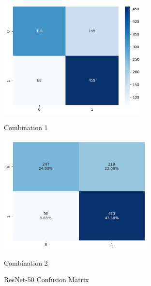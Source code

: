 \begin{figure}[H]
    \centering
    \begin{minipage}[b]{0.49\textwidth}
        \centering
        \includegraphics[width=\textwidth, height=6cm]{Figures/balanced_data/less_data/withoutbn/resnet/cm.png}
        \captionsetup{labelformat=empty}
        \caption{Combination 1}
        \label{fig:u_wo_r_cm}
    \end{minipage}
    \hfill
    \begin{minipage}[b]{0.49\textwidth}
        \centering
        \includegraphics[width=\textwidth, height=6cm]{Figures/balanced_data/less_data/withbn/resnet/cm.png}
        \captionsetup{labelformat=empty}
        \caption{Combination 2}
        \label{fig:u_w_r_cm}
    \end{minipage}
    \captionsetup{labelformat=default}
    \caption{ResNet-50 Confusion Matrix}
\end{figure}


